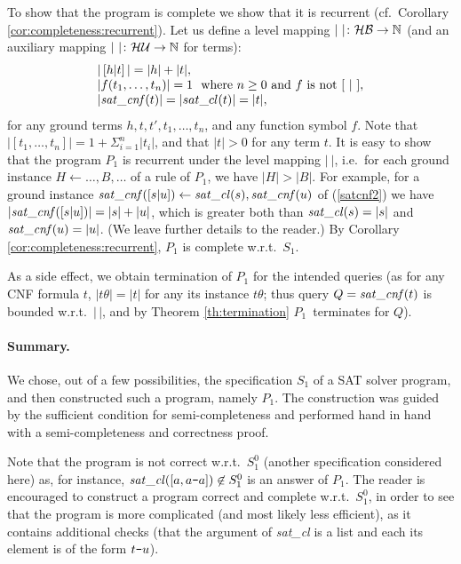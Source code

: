 \documentclass{tlp}
\newcommand*{\seq}[2][n]  {{#2_{1}, \allowbreak \ldots, \allowbreak #2_{#1}}}
\newcommand*{\mydash}{{\mbox{\tt-}}}
\newcommand*{\HU}{{\ensuremath{\cal{H U}}}\xspace}
\newcommand*{\HB}{{\ensuremath{\cal{H B}}}\xspace}
\newcommand*{\NN}{{\ensuremath{\mathbb{N}}}\xspace}
\begin{document}
To show that the program is complete we show that it is recurrent
(cf.\ Corollary \ref{cor:completeness:recurrent}).
Let us define a level mapping  \mbox{$|\ |\colon \HB\to \NN$}
(and an auxiliary mapping  $|\ |\colon \HU\to \NN$ for terms):
\[
\begin{array}{l}
  |\, [h|t]\, | = |h|+|t|,    \\
  |f(\seq t)| = 1 \ \mbox{ where $n\geq0$ and $f$ is not }[\ | \ ],    \\
|  {\it sat\_c n f}(t) | = | sat\_cl(t)|  = |t|,
    \\
\end{array}
\]
for any ground terms $h,t,t',\seq t$, and any function symbol $f$. 
Note that $|[\seq t]| = 1+ \Sigma_{i=1}^n |t_i|$, and that
$|t|>0$ for any term $t$.
It is easy to show that the program $P_1$ is recurrent under the level
mapping $|\ |$, i.e.\ 
for each ground instance $H\gets\ldots,B,\ldots$ of a rule of  $P_1$,
we have $|H|> |B|$.  For example, for a ground instance 
${\it sat\_c n f}([s|u])\gets {\it sat\_cl}(s),{\it sat\_c n f}(u)$
of (\ref{satcnf2}) we have
$|{\it sat\_c n f}([s|u])| = |s|+|u|$, which is greater both than
${\it sat\_cl}(s) =  |s|$ and ${\it sat\_c n f}(u)= |u| $.
(We leave further details to the reader.)
By Corollary \ref{cor:completeness:recurrent}, $P_1$ is complete w.r.t.\ $S_1$.


As a side effect, we obtain termination of $P_1$ for the intended queries
(as for any CNF formula $t$, $|t\theta|=|t|$ for any its instance $t\theta$;
thus query $Q={\it sat\_c n f}(t)$ is bounded  w.r.t.\ $|\,|$, 
and by Theorem \ref{th:termination} $P_1$~terminates for $Q$).


\paragraph{Summary.}
We chose, out of a few possibilities, the specification $S_1$ of a SAT solver
program, and then constructed such a program, namely $P_1$.
The construction was guided by the sufficient condition for semi-completeness
and performed hand in hand with a semi-completeness and correctness proof.

Note that the program is not correct w.r.t.\ $S_1^0$ (another 
specification considered here)
as, for instance, ${\it sat\_cl}([a,a\mydash a])\not\in S_1^0$ is an answer
of $P_1$. 
The reader is encouraged to construct a program correct and complete w.r.t.\ 
$S_1^0$,
in order to see that the program is more complicated (and most likely less
efficient), as it contains additional checks 
(that the argument of {\it sat\_cl} is a list and each its element is of the
form $t\mydash u$).
\end{document}
